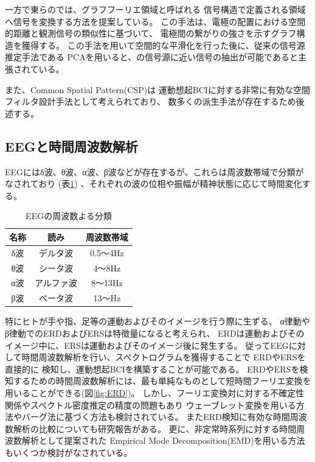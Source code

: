 一方で東らの\cite{グラフフーリエ}では、グラフフーリエ領域と呼ばれる
信号構造で定義される領域へ信号を変換する方法を提案している。
この手法は、電極の配置における空間的距離と観測信号の類似性に基づいて、
電極間の繋がりの強さを示すグラフ構造を獲得する。
この手法を用いて空間的な平滑化を行った後に、従来の信号源推定手法である
PCAを用いると、の信号源に近い信号の抽出が可能であると主張されている。

また、Common Spatial Pattern(CSP)は
運動想起BCIに対する非常に有効な空間フィルタ設計手法として考えられており、
数多くの派生手法が存在するため後述する。

\subsection{\mc EEGと時間周波数解析}
EEGにはδ波、θ波、α波、β波などが存在するが、これらは周波数帯域で分類がなされており
(表\ref{table:eegtype})
、それぞれの波の位相や振幅が精神状態に応じて時間変化する。
\begin{table}[tbp]
    \centering
    \caption{EEGの周波数よる分類}
    \begin{tabular}{|c|c|c|} \hline
        名称 & 読み & 周波数帯域 \\ 
        \hline
        δ波 & デルタ波 & 0.5〜4Hz \\ 
        \hline
        θ波 & シータ波 & 4〜8Hz \\ 
        \hline
        α波 & アルファ波 & 8〜13Hz \\ 
        \hline
        β波 & ベータ波 & 13〜Hz \\
        \hline
    \end{tabular}
    \label{table:eegtype}
\end{table}
特にヒトが手や指、足等の運動およびそのイメージを行う際に生ずる、
α律動やβ律動でのERDおよびERSは特徴量になると考えられ、
ERDは運動およびそのイメージ中に、ERSは運動およびそのイメージ後に発生する\cite{ERDとERS}。
従ってEEGに対して時間周波数解析を行い、スペクトログラムを獲得することで
ERDやERSを直接的に
検知し、運動想起BCIを構築することが可能である\cite{Beta波によるBCI}。
ERDやERSを検知するための時間周波数解析には、最も単純なものとして短時間フーリエ変換を用いることができる(図\ref{fig:ERD})。
しかし、フーリエ変換対に対する不確定性関係やスペクトル密度推定の精度の問題もあり
ウェーブレット変換を用いる方法やバーグ法に基づく方法も検討されている。
またERD検知に有効な時間周波数解析の比較についても研究報告がある\cite{時間周波数解析の比較}。
更に、非定常時系列に対する時間周波数解析として提案された
Empirical Mode Decomposition(EMD)を用いる方法もいくつか検討がなされている\cite{EMD,IMF}。

